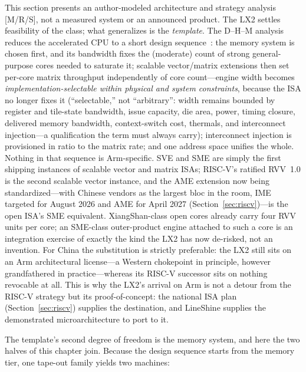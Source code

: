 This section presents an author-modeled architecture and strategy analysis [M/R/S], not a measured system or an announced product. The LX2 settles feasibility of the class; what generalizes is the \emph{template}. The D--H--M analysis reduces the accelerated CPU to a short design sequence~\cite{dhm-long}: the memory system is chosen first, and its bandwidth fixes the (moderate) count of strong general-purpose cores needed to saturate it; scalable vector/matrix extensions then set per-core matrix throughput independently of core count---engine width becomes \emph{implementation-selectable within physical and system constraints}, because the ISA no longer fixes it (``selectable,'' not ``arbitrary'': width remains bounded by register and tile-state bandwidth, issue capacity, die area, power, timing closure, delivered memory bandwidth, context-switch cost, thermals, and interconnect injection---a qualification the term must always carry); interconnect injection is provisioned in ratio to the matrix rate; and one address space unifies the whole. Nothing in that sequence is Arm-specific. SVE and SME are simply the first shipping instances of scalable vector and matrix ISAs; RISC-V's ratified RVV~1.0 is the second scalable vector instance, and the AME extension now being standardized---with Chinese vendors as the largest bloc in the room, IME targeted for August 2026 and AME for April 2027 (Section~\ref{sec:riscv})---is the open ISA's SME equivalent. XiangShan-class open cores already carry four RVV units per core; an SME-class outer-product engine attached to such a core is an integration exercise of exactly the kind the LX2 has now de-risked, not an invention. For China the substitution is strictly preferable: the LX2 still sits on an Arm architectural license---a Western chokepoint in principle, however grandfathered in practice---whereas its RISC-V successor sits on nothing revocable at all. This is why the LX2's arrival on Arm is not a detour from the RISC-V strategy but its proof-of-concept: the national ISA plan (Section~\ref{sec:riscv}) supplies the destination, and LineShine supplies the demonstrated microarchitecture to port to it.

The template's second degree of freedom is the memory system, and here the two halves of this chapter join. Because the design sequence starts from the memory tier, one tape-out family yields two machines:

